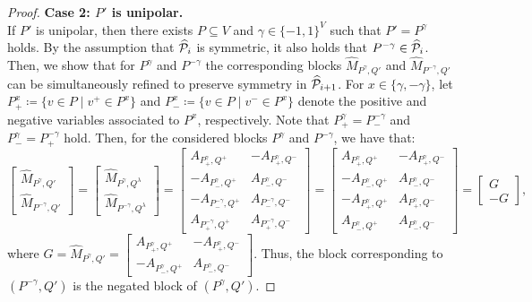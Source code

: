 \documentclass[pdflatex,sn-mathphys-num]{sn-jnl}%
\theoremstyle{thmstyleone}%
\theoremstyle{thmstylethree}%
\theoremstyle{thmstyletwo}%
\begin{document}
\begin{proof}
    \noindent\textbf{Case 2: $P'$ is unipolar.}\\
    If $P'$ is unipolar, then there exists $P\subseteq V$ and $\gamma\in \{-1,1\}^V$ such that $P' = P^\gamma$ holds. By the assumption that $\widehat{\mathcal{P}}_i$ is symmetric, it also holds that $P^{-\gamma} \in \widehat{\mathcal{P}}_i$. Then, we show that for $P^\gamma$ and $P^{-\gamma}$ the corresponding blocks $\widehat{M}_{P^\gamma,Q'}$ and $\widehat{M}_{P^{-\gamma},Q'}$ can be simultaneously refined to preserve symmetry in $\widehat{\mathcal{P}}_{i+1}$. For $x\in \{\gamma,-\gamma\}$, let $P^{x}_+ \coloneqq \{v\in P \mid v^+ \in P^x\}$ and $P^{x}_- \coloneqq \{ v\in P \mid v^- \in P^{x}\}$ denote the positive and negative variables associated to $P^x$, respectively. Note that $P^{\gamma}_+ = P^{-\gamma}_-$ and $P^{\gamma}_- = P^{-\gamma}_+$ hold. 
    Then, for the considered blocks $P^\gamma$ and $P^{-\gamma}$, we have that:
    \begin{equation*}
    \begin{bmatrix}
        \widehat{M}_{P^\gamma,Q'} \\
        \widehat{M}_{P^{-\gamma},Q'} 
    \end{bmatrix} = \begin{bmatrix}
        \widehat{M}_{P^\gamma,Q^\lambda} \\
        \widehat{M}_{P^{-\gamma},Q^\lambda} 
    \end{bmatrix} = 
    \begin{bmatrix}
        A_{P^\gamma_+,Q^+} & -A_{P^\gamma_+,Q^-} \\
        -A_{P^\gamma_-,Q^+} & A_{P^\gamma_-,Q^-} \\
        -A_{P^{-\gamma}_-,Q^+} & A_{P^{-\gamma}_-,Q^-} \\
        A_{P^{-\gamma}_+,Q^+} & A_{P^{-\gamma}_+,Q^-}
    \end{bmatrix} = \begin{bmatrix}
        A_{P^\gamma_+,Q^+} & -A_{P^\gamma_+,Q^-} \\
        -A_{P^\gamma_-,Q^+} & A_{P^\gamma_-,Q^-} \\
        -A_{P^{\gamma}_+,Q^+} & A_{P^{\gamma}_+,Q^-} \\
        A_{P^{\gamma}_-,Q^+} & A_{P^{\gamma}_-,Q^-}
    \end{bmatrix} = \begin{bmatrix}
        G\\
        -G
    \end{bmatrix},
    \end{equation*} where $G=\widehat{M}_{P^\gamma,Q'} = \begin{bmatrix}
        A_{P^\gamma_+,Q^+} & -A_{P^\gamma_+,Q^-} \\
        -A_{P^\gamma_-,Q^+} & A_{P^\gamma_-,Q^-}
    \end{bmatrix}$. Thus, the block corresponding to $(P^{-\gamma},Q')$ is the negated block of $(P^\gamma,Q')$.
    

\end{proof}
\end{document}
